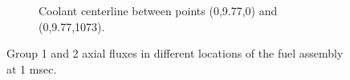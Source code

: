 \documentclass[11pt,letterpaper]{article}
\begin{document}
\begin{figure}[htbp!]
\begin{subfigure}[t]{0.4\textwidth}
			\caption{Coolant centerline between points (0,9.77,0) and (0,9.77,1073).}
		\end{subfigure}
		\hfill
		\caption{Group 1 and 2 axial fluxes in different locations of the fuel assembly at 1 msec.}
		\label{fig:3D-assembly1}
	\end{figure}


\pagebreak

% 
\end{document}
